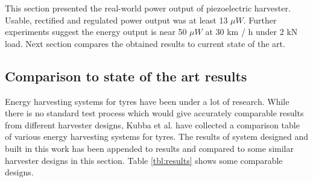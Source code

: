 This section presented the real-world power output of piezoelectric harvester. Usable, rectified and regulated power output was at least 13 $\mu W$. Further experiments suggest the energy output is near 50 $\mu W$ at 30 km / h under 2 kN load. Next section compares the obtained results to current state of the art.

\subsection{Comparison to state of the art results}\label{sect:state-of-art}
Energy harvesting systems for tyres have been under a lot of research. While there is no standard test process which would give accurately comparable results from different harvester designs, Kubba et al. \cite{Kubba2014} have 
collected a comparison table of various energy harvesting systems for tyres. The results of system designed and built in this work has been appended to results and compared to some similar harvester designs in this section. Table \ref{tbl:results} shows some comparable designs.

\begin{table}[htb]
\caption{\label{tbl:results} The designed system compared to current state of the art tyre energy harvester results \cite{Kubba2014}.}
\begin{center}
\end{center}
\end{table}

